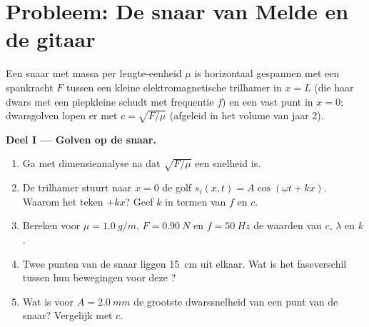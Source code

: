 \section{Probleem: De snaar van Melde en de gitaar}

\begin{problem}
\label{pb:b1:wave-propagation:1}
Een snaar met massa per lengte-eenheid $\mu$ is horizontaal gespannen met een
spankracht $F$ tussen een kleine elektromagnetische trilhamer in $x = L$ (die
haar dwars met een piepkleine  schudt met frequentie $f$) en een
vast punt in $x = 0$; dwarsgolven lopen er met
$c = \sqrt{F/\mu}$ (afgeleid in het volume van jaar 2).

\medskip
\noindent\textbf{Deel I --- Golven op de snaar.}
\begin{enumerate}
  \item Ga met dimensieanalyse na dat $\sqrt{F/\mu}$ een snelheid is.
  \item De trilhamer stuurt naar $x = 0$ de golf
        $s_i(x, t) = A\cos(\omega t + kx)$. Waarom het teken $+kx$? Geef $k$
        in termen van $f$ en $c$.
  \item Bereken voor $\mu = \qty{1.0}{g/m}$, $F = \qty{0.90}{N}$ en
        $f = \qty{50}{Hz}$ de waarden van $c$, $\lambda$ en $k$.
  \item Twee punten van de snaar liggen \qty{15}{cm} uit elkaar. Wat is het
        faseverschil tussen hun bewegingen voor deze ?
  \item Wat is voor $A = \qty{2.0}{mm}$ de grootste dwarssnelheid
        van een punt van de snaar? Vergelijk met $c$.
\end{enumerate}


\end{problem}
